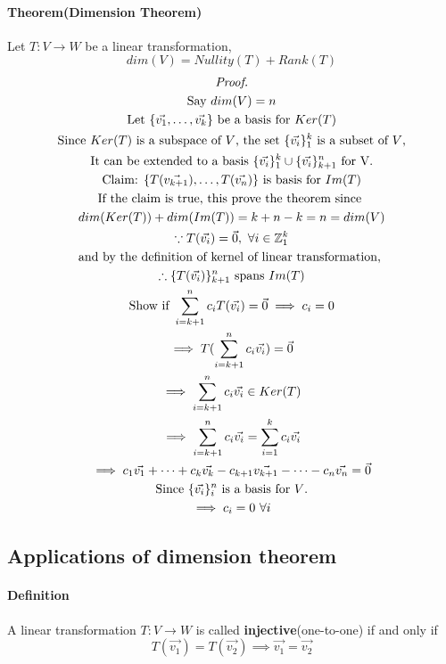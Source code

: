 \documentclass[11pt]{article}
\begin{document}
	\paragraph{Theorem(Dimension Theorem)} Let $T: V \to W$ be a linear transformation, 
	\[
		dim(V) = Nullity(T) + Rank(T)
	\]
	\begin{multline*}
		\emph{Proof.} \\
		\text{Say } dim(V) = n \\
		\text{Let } \{\vec{v_1},\dots,\vec{v_k}\} \text{ be a basis for } Ker(T) \\
		\text{Since $Ker(T)$ is a subspace of $V$, the set } \{\vec{v_i}\}_1^k \text{ is a subset of $V$,} \\
		\text{It can be extended to a basis } \{\vec{v_i}\}_1^k \cup \{\vec{v_i}\}_{k+1}^n \text{ for } $V$. \\
		\text{Claim: } \{T(\vec{v_{k+1}}),\dots,T(\vec{v_n})\} \text{ is basis for } Im(T) \\
		\text{If the claim is true, this prove the theorem since } \\
		dim(Ker(T)) + dim(Im(T)) = k + n - k = n = dim(V) \\
		\because T(\vec{v_i}) = \vec{0},\ \forall i \in \mathbb{Z}_1^k \\
		\text{and by the definition of kernel of linear transformation, }\\
		\therefore \{T(\vec{v_i})\}_{k+1}^n \text{ spans } Im(T) \\
		\text{Show if } \sum_{i=k+1}^n{c_iT(\vec{v_i})} = \vec{0} \implies c_i = 0 \\
		\implies T(\sum_{i=k+1}^n{c_i\vec{v_i}}) = \vec{0} \\
		\implies \sum_{i=k+1}^n{c_i\vec{v_i}} \in Ker(T) \\
		\implies \sum_{i=k+1}^n{c_i\vec{v_i}} = \sum_{i=1}^k {c_i \vec{v_i}} \\
		\implies c_1\vec{v_1} + \dots + c_k\vec{v_k} - c_{k+1}\vec{v_{k+1}} - \dots - c_{n}\vec{v_n} = \vec{0} \\
		\text{Since } \{\vec{v_i}\}_i^n \text{ is a basis for $V$.} \\
		\implies c_i = 0\ \forall i \\
 	\end{multline*}
 	
 	\subsection{Applications of dimension theorem}
 	\paragraph{Definition} A linear transformation $T: V \to W$ is called \textbf{injective}(one-to-one) if and only if
 	\[
 		T(\vec{v_1}) = T(\vec{v_2}) \implies \vec{v_1} = \vec{v_2}
 	\]
\end{document}
